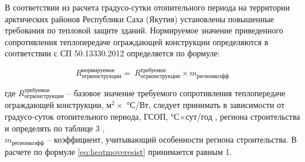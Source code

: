 В соответствии \Code{[5]} из расчета градусо-сутки отопительного периода на территории арктических районов Республики Саха (Якутия)
установлены повышенные требования по тепловой защите зданий. Нормируемое значение приведенного сопротивления теплопередаче ограждающей конструкции определяются
в соответствии с СП 50.13330.2012 \Code{[5]} определяется по формуле:

\begin{eqndesc}
    \begin{equation}\label{eq:heatmoveresist}
        R_\text{огрконструкции}^\text{нормируемое}=\ R_\text{огрконструкции}^\text{требуемое}\times m_\text{регионкоэфф}
    \end{equation}

    где $R_\text{огрконструкции}^\text{требуемое}$ -- базовое значение требуемого сопротивления теплопередаче ограждающей конструкции, м$^2 \times$ °С\slash Вт, следует принимать в зависимости от градусо-суток отопительного периода, ГСОП, °С$\times$сут\slash год , региона строительства и определять по таблице 3 \Code{[5]}, \\
    $m_\text{регионкоэфф}$ -- коэффициент, учитывающий особенности региона строительства. В расчете по формуле \eqref{eq:heatmoveresist} принимается равным 1.
\end{eqndesc}


